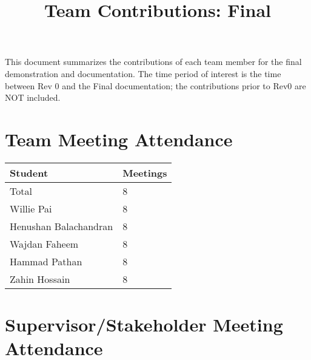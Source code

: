 \documentclass{article}
\title{Team Contributions: Final\\\progname}
\author{\authname}
\date{}
\begin{document}
\maketitle

This document summarizes the contributions of each team member for the final
demonstration and documentation.  The time period of interest is the time
between Rev 0 and the Final documentation; the contributions prior to Rev0 are
NOT included.

\section{Team Meeting Attendance}


\begin{table}[H]
\centering
\begin{tabular}{ll}
\toprule
\textbf{Student} & \textbf{Meetings}\\
\midrule
Total & 8\\
Willie Pai & 8\\
Henushan Balachandran & 8\\
Wajdan Faheem & 8\\
Hammad Pathan & 8\\
Zahin Hossain & 8\\
\bottomrule
\end{tabular}
\end{table}


\section{Supervisor/Stakeholder Meeting Attendance}

\end{document}

